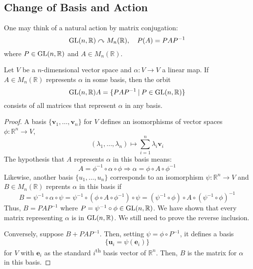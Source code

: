 \documentclass[10pt, a4paper, twoside]{report}
\begin{document}
\subsection{Change of Basis and Action}
One may think of a natural action by matrix conjugation:
\[\operatorname{GL}(n,\mathbb{R})\curvearrowright M_n(\mathbb{R}),\quad P(A)=PAP^{-1}\]
where \(P\in\operatorname{GL}(n,\mathbb{R})\) and \(A\in M_n(\mathbb{R})\).
\begin{proposition}
    Let \(V\) be a \(n\)-dimensional vector space and \(\alpha:V\to V\) a linear map. If \(A\in M_n(\mathbb{R})\) represents \(\alpha\) in some basis, then the orbit 
    \[\operatorname{GL}(n,\mathbb{R})A=\{PAP^{-1}\:|\:P\in\operatorname{GL}(n,\mathbb{R})\}\]
    consists of all matrices that represent \(\alpha\) in any basis.
\end{proposition}
\begin{proof}
    A basis \(\{\mathbf{v}_1,\ldots,\mathbf{v}_n\}\) for \(V\) defines an isomorphisms of vector spaces \(\phi:\mathbb{R}^n\to V\),
    \[(\lambda_1,\ldots,\lambda_n)\mapsto\sum_{i=1}^n\lambda_i\mathbf{v}_i\]
    The hypothesis that \(A\) represents \(\alpha\) in this basis means:
    \[A=\phi^{-1}\circ\alpha\circ\phi\Rightarrow\alpha=\phi\circ A\circ\phi^{-1}\]
    Likewise, another basis \(\{u_1,\ldots,u_n\}\) corresponds to an isomorphism \(\psi:\mathbb{R}^n\to V\) and \(B\in M_n(\mathbb{R})\) reprents \(\alpha\) in this basis if 
    \[B=\psi^{-1}\circ\alpha\circ\psi=\psi^{-1}\circ(\phi\circ A\circ\phi^{-1})\circ\psi=(\psi^{-1}\circ\phi)\circ A\circ(\psi^{-1}\circ\phi)^{-1}\]
    Thus, \(B=PAP^{-1}\) where \(P=\psi^{-1}\circ\phi\in\operatorname{GL}(n,\mathbb{R})\). We have shown that every matrix representing \(\alpha\) is in \(\operatorname{GL}(n,\mathbb{R})\). We still need to prove the reverse inclusion.

    Conversely, suppose \(B+PAP^{-1}\). Then, setting \(\psi=\phi\circ P^{-1}\), it defines a basis 
    \[\{\mathbf{u}_i=\psi(\mathbf{e}_i)\}\]
    for \(V\) with \(\mathbf{e}_i\) as the standard \(i\)\textsuperscript{th}
    basis vector of \(\mathbb{R}^n\). Then, \(B\) is the matrix for \(\alpha\) in this basis.
\end{proof}
\end{document}
